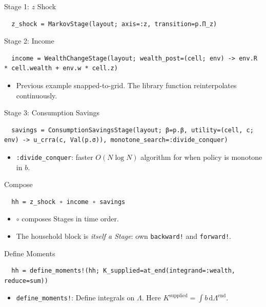 \documentclass[10pt,aspectratio=169]{beamer}
\begin{document}
\begin{frame}[fragile]{Stage 1: $z$ Shock}
  \begin{lstlisting}
  z_shock = MarkovStage(layout; axis=:z, transition=p.Π_z)
  \end{lstlisting}
\end{frame}

\begin{frame}[fragile]{Stage 2: Income}
  \begin{lstlisting}
  income = WealthChangeStage(layout; wealth_post=(cell; env) -> env.R * cell.wealth + env.w * cell.z)
  \end{lstlisting}
  \begin{itemize}
    \item Previous example snapped-to-grid. The library function reinterpolates continuously.
  \end{itemize}
\end{frame}

\begin{frame}[fragile]{Stage 3: Consumption Savings}
  \begin{lstlisting}
  savings = ConsumptionSavingsStage(layout; β=p.β, utility=(cell, c; env) -> u_crra(c, Val(p.σ)), monotone_search=:divide_conquer)
  \end{lstlisting}
  \begin{itemize}
    \item \texttt{:divide\_conquer}: faster $O(N \log N)$ algorithm for when policy is monotone in $b$.
  \end{itemize}
\end{frame}

\begin{frame}[fragile]{Compose}
  \begin{lstlisting}
  hh = z_shock ∘ income ∘ savings
  \end{lstlisting}
  \begin{itemize}
    \item \texttt{$\circ$} composes Stages in time order.
    \item The household block is \emph{itself a Stage}: own \texttt{backward!} and \texttt{forward!}.
  \end{itemize}
\end{frame}

\begin{frame}[fragile]{Define Moments}
  \begin{lstlisting}
  hh = define_moments!(hh; K_supplied=at_end(integrand=:wealth, reduce=sum))
  \end{lstlisting}
  \begin{itemize}
    \item \texttt{define\_moments!}: Define integrals on $\Lambda$. Here $K^{\mathrm{supplied}} = \int b\,\mathrm{d}\Lambda^\text{end}$.
  \end{itemize}
\end{frame}
\end{document}
